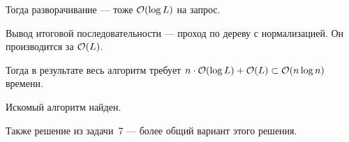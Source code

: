 Тогда разворачивание --- тоже $\mathcal{O}(\log L)$ на запрос.

Вывод итоговой последовательности --- проход по дереву с нормализацией.
Он производится за $\mathcal{O}(L)$.

Тогда в результате весь алгоритм требует $n \cdot \mathcal{O}(\log L) + \mathcal{O}(L) \subset \mathcal{O}(n \log n)$
времени.

Искомый алгоритм найден.

Также решение из задачи~7 --- более общий вариант этого решения.
